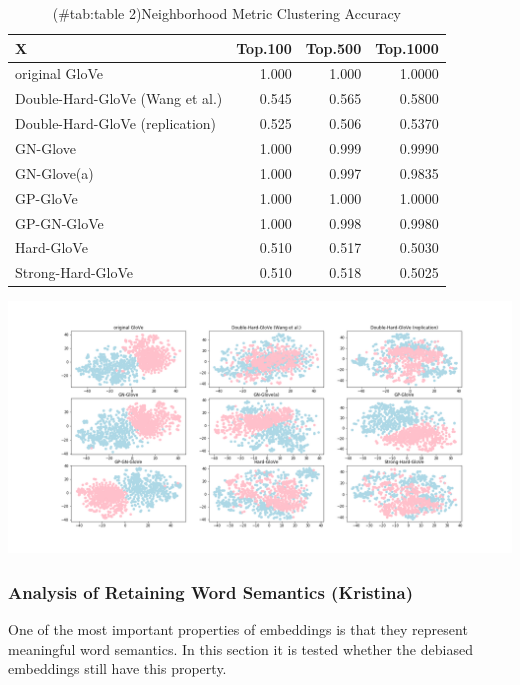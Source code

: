 \documentclass[
  english,
  man,floatsintext]{apa6}
\begin{document}
\begin{table}

\caption{(\#tab:table 2)Neighborhood Metric Clustering Accuracy}
\centering
\begin{tabular}[t]{l|r|r|r}
\hline
X & Top.100 & Top.500 & Top.1000\\
\hline
original GloVe & 1.000 & 1.000 & 1.0000\\
\hline
Double-Hard-GloVe (Wang et al.) & 0.545 & 0.565 & 0.5800\\
\hline
Double-Hard-GloVe (replication) & 0.525 & 0.506 & 0.5370\\
\hline
GN-Glove & 1.000 & 0.999 & 0.9990\\
\hline
GN-Glove(a) & 1.000 & 0.997 & 0.9835\\
\hline
GP-GloVe & 1.000 & 1.000 & 1.0000\\
\hline
GP-GN-GloVe & 1.000 & 0.998 & 0.9980\\
\hline
Hard-GloVe & 0.510 & 0.517 & 0.5030\\
\hline
Strong-Hard-GloVe & 0.510 & 0.518 & 0.5025\\
\hline
\end{tabular}
\end{table}

\includegraphics{evaluation_results/results_tsne.png}

\hypertarget{analysis-of-retaining-word-semantics-kristina}{%
\subsubsection{Analysis of Retaining Word Semantics (Kristina)}\label{analysis-of-retaining-word-semantics-kristina}}

One of the most important properties of embeddings is that they represent meaningful word semantics. In this section it is tested whether the debiased embeddings still have this property.
\end{document}
